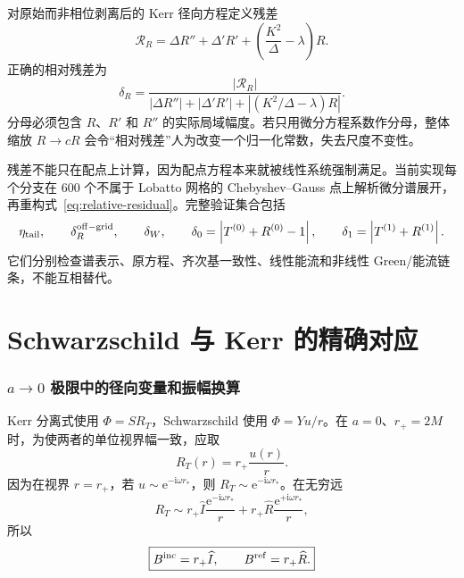 \documentclass[UTF8,a4paper,11pt]{ctexart}
\newcommand{\ii}{\mathrm i}
\newcommand{\ee}{\mathrm e}
\newcommand{\Bin}{B^{\rm inc}}
\newcommand{\Bref}{B^{\rm ref}}
\newcommand{\Deltak}{\Delta}
\newcommand{\abs}[1]{\left|#1\right|}
\begin{document}
对原始而非相位剥离后的 Kerr 径向方程定义残差
\begin{equation}
\mathcal R_R=\Deltak R''+\Deltak'R'
+\left(\frac{K^2}{\Deltak}-\lambda\right)R.
\end{equation}
正确的相对残差为
\begin{equation}
\boxed{
\delta_R=
\frac{\abs{\mathcal R_R}}
{\abs{\Deltak R''}+\abs{\Deltak'R'}
+\abs{(K^2/\Deltak-\lambda)R}}.}
\label{eq:relative-residual}
\end{equation}
分母必须包含 $R$、$R'$ 和 $R''$ 的实际局域幅度。若只用微分方程系数作分母，整体缩放 $R\to cR$ 会令“相对残差”人为改变一个归一化常数，失去尺度不变性。

残差不能只在配点上计算，因为配点方程本来就被线性系统强制满足。当前实现每个分支在 600 个不属于 Lobatto 网格的 Chebyshev--Gauss 点上解析微分谱展开，再重构式~\eqref{eq:relative-residual}。完整验证集合包括
\begin{equation}
\eta_{\rm tail},\qquad
\delta_R^{\rm off-grid},\qquad
\delta_W,\qquad
\delta_0=\abs{T^{(0)}+R^{(0)}-1},\qquad
\delta_1=\abs{T^{(1)}+R^{(1)}}.
\label{eq:all-diagnostics}
\end{equation}
它们分别检查谱表示、原方程、齐次基一致性、线性能流和非线性 Green/能流链条，不能互相替代。

\part{Schwarzschild 与 Kerr 的精确对应}

\section{\texorpdfstring{$a\to0$}{a to 0} 极限中的径向变量和振幅换算}
\label{sec:a0}

Kerr 分离式使用 $\Phi=SR_T$，Schwarzschild 使用 $\Phi=Yu/r$。在 $a=0$、$r_+=2M$ 时，为使两者的单位视界幅一致，应取
\begin{equation}
\boxed{R_T(r)=r_+\frac{u(r)}{r}.}
\label{eq:RT-u}
\end{equation}
因为在视界 $r=r_+$，若 $u\sim\ee^{-\ii\omega r_*}$，则 $R_T\sim\ee^{-\ii\omega r_*}$。在无穷远
\begin{equation}
R_T\sim r_+\widehat I\frac{\ee^{-\ii\omega r_*}}{r}
+r_+\widehat R\frac{\ee^{+\ii\omega r_*}}{r},
\end{equation}
所以
\begin{equation}
\boxed{\Bin=r_+\widehat I,\qquad \Bref=r_+\widehat R.}
\label{eq:B-I}
\end{equation}
\end{document}
